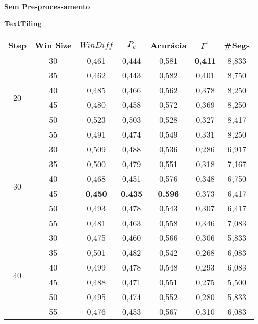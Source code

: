 \documentclass{article}
\begin{document}
\newpage



{  
\Large
\center
	\textbf{Sem Pre-processamento}  

}

{  
\large
\center
	\textbf{TextTiling}  

}


\begin{table}[!h]
\center
	\begin{tabular}{|c|c||c|c|c|c|c|}
\hline 
 Step & Win Size & $WinDiff$ & $P_k$ & Acurácia & $F^1$ & \#Segs\\ \hline 
 \multirow{6}{*}{20} 
  & 30 & 0,461 & 0,444 & 0,581 & \cellcolor{gray!20} \textbf{0,411} & 8,833  \\ \cline{2-7}
  & 35 & 0,462 & 0,443 & 0,582 & 0,401 & 8,750  \\  \cline{2-7}
  & 40 & 0,485 & 0,466 & 0,562 & 0,378 & 8,250  \\  \cline{2-7}
  & 45 & 0,480 & 0,458 & 0,572 & 0,369 & 8,250  \\  \cline{2-7}
  & 50 & 0,523 & 0,503 & 0,528 & 0,327 & 8,417  \\  \cline{2-7}
  & 55 & 0,491 & 0,474 & 0,549 & 0,331 & 8,250  \\ \hline 
 \multirow{6}{*}{30} 
  & 30 & 0,509 & 0,488 & 0,536 & 0,286 & 6,917  \\ \cline{2-7}
  & 35 & 0,500 & 0,479 & 0,551 & 0,318 & 7,167  \\ \cline{2-7}
  & 40 & 0,468 & 0,451 & 0,576 & 0,348 & 6,750  \\ \cline{2-7}
  & 45 & \cellcolor{gray!20} \textbf{0,450} & \cellcolor{gray!20} \textbf{0,435} & \cellcolor{gray!20} \textbf{0,596} & 0,373 & 6,417  \\  \cline{2-7}
  & 50 & 0,493 & 0,478 & 0,543 & 0,307 & 6,417  \\ \cline{2-7}
  & 55 & 0,481 & 0,463 & 0,558 & 0,346 & 7,083  \\ \hline 
 \multirow{6}{*}{40} 
  & 30 & 0,475 & 0,460 & 0,566 & 0,306 & 5,833  \\ \cline{2-7}
  & 35 & 0,501 & 0,482 & 0,542 & 0,268 & 6,083  \\ \cline{2-7}
  & 40 & 0,499 & 0,478 & 0,548 & 0,293 & 6,083  \\ \cline{2-7}
  & 45 & 0,488 & 0,471 & 0,551 & 0,275 & 5,500  \\ \cline{2-7}
  & 50 & 0,495 & 0,474 & 0,552 & 0,280 & 5,833  \\ \cline{2-7}
  & 55 & 0,476 & 0,453 & 0,567 & 0,310 & 6,083  \\ \hline 

\end{tabular}
\end{table}
\end{document}
